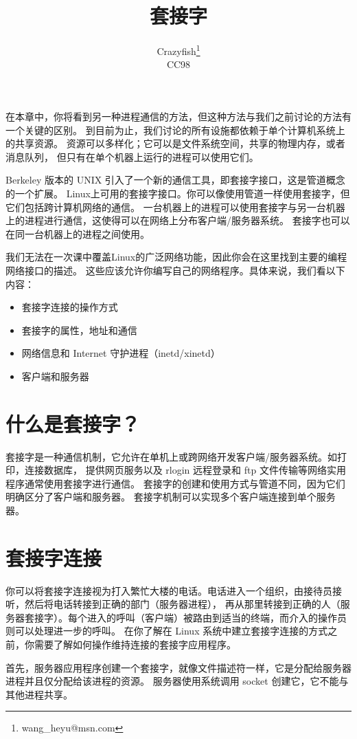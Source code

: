 \documentclass{ctexart}
\title{套接字}
\author{Crazyfish\footnote{wang\_heyu@msn.com} \\ CC98}
\date{}
\begin{document}
\maketitle

在本章中，你将看到另一种进程通信的方法，但这种方法与我们之前讨论的方法有一个关键的区别。
到目前为止，我们讨论的所有设施都依赖于单个计算机系统上的共享资源。
资源可以多样化；它可以是文件系统空间，共享的物理内存，或者消息队列，
但只有在单个机器上运行的进程可以使用它们。  
  
Berkeley 版本的 UNIX 引入了一个新的通信工具，即套接字接口，这是管道概念的一个扩展。
Linux上可用的套接字接口。你可以像使用管道一样使用套接字，但它们包括跨计算机网络的通信。
一台机器上的进程可以使用套接字与另一台机器上的进程进行通信，这使得可以在网络上分布客户端/服务器系统。
套接字也可以在同一台机器上的进程之间使用。  
  
我们无法在一次课中覆盖Linux的广泛网络功能，因此你会在这里找到主要的编程网络接口的描述。
这些应该允许你编写自己的网络程序。具体来说，我们看以下内容：  
\begin{itemize}  
\item 套接字连接的操作方式  
\item 套接字的属性，地址和通信  
\item 网络信息和 Internet 守护进程（inetd/xinetd）  
\item 客户端和服务器  
\end{itemize}  

\section{什么是套接字？}  
套接字是一种通信机制，它允许在单机上或跨网络开发客户端/服务器系统。如打印，连接数据库，
提供网页服务以及 rlogin 远程登录和 ftp 文件传输等网络实用程序通常使用套接字进行通信。  
套接字的创建和使用方式与管道不同，因为它们明确区分了客户端和服务器。
套接字机制可以实现多个客户端连接到单个服务器。  

\section{套接字连接}  
你可以将套接字连接视为打入繁忙大楼的电话。电话进入一个组织，由接待员接听，然后将电话转接到正确的部门（服务器进程），
再从那里转接到正确的人（服务器套接字）。每个进入的呼叫（客户端）被路由到适当的终端，而介入的操作员则可以处理进一步的呼叫。
在你了解在 Linux 系统中建立套接字连接的方式之前，你需要了解如何操作维持连接的套接字应用程序。  
  
首先，服务器应用程序创建一个套接字，就像文件描述符一样，它是分配给服务器进程并且仅分配给该进程的资源。
服务器使用系统调用 socket 创建它，它不能与其他进程共享。  
  
\end{document}
